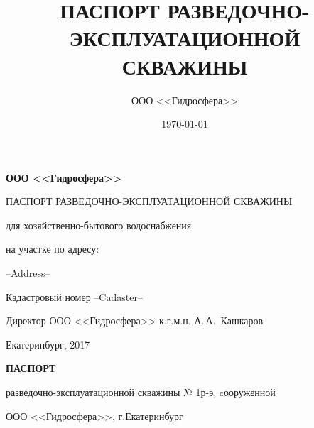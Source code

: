 \documentclass[a4paper,12pt]{article} %
\author{ООО <<Гидросфера>>}\label{company}
\title{ПАСПОРТ РАЗВЕДОЧНО-ЭКСПЛУАТАЦИОННОЙ СКВАЖИНЫ}
\date{\today}
\newcommand{\txtExecutor}{ООО <<Гидросфера>>}	%
\newcommand{\txtYear}{2017}						%
\newcommand{\txtNumber}{№ 1р-э}  				%
\newcommand{\txtAddress}{--Address--} 		%
\newcommand{\txtCadaster}{--Cadaster--} 	%
\begin{document}

\setlength{\extrarowheight}{1mm} %


\begin{titlepage}
	\begin{center}
		\textbf{\txtExecutor}
		\vspace{5.5cm}
		
		{\LARGE ПАСПОРТ РАЗВЕДОЧНО-ЭКСПЛУАТАЦИОННОЙ СКВАЖИНЫ}
		\vspace{0.25cm}
		
		для хозяйственно-бытового водоснабжения
		
		\bigskip
		
		на участке по адресу:
				
		\underline{\txtAddress}
		
		\bigskip
		Кадастровый номер \txtCadaster
		
		\vfill
	
		\bigskip
		
	\end{center}

	\vfill
	
	\newlength{\ML}
	\hfill
	\begin{minipage}{1.0\textwidth}
		Директор ООО <<Гидросфера>> к.г.м.н.
		\underline{\hspace{\ML}} А.\,А.~Кашкаров\\
	\end{minipage}%
	
	\bigskip
	
	\vfill
	\begin{center}
		Екатеринбург, \txtYear
	\end{center}			

	\end{titlepage}


	\begin{center}
		\textbf{ПАСПОРТ}

		разведочно-эксплуатационной скважины \txtNumber, cооруженной 

		\txtExecutor, г.Екатеринбург

	\end{center}
\end{document}
